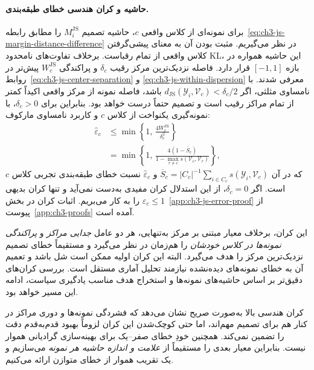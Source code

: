 \paragraph{حاشیه و کران هندسی خطای طبقه‌بندی.}
برای نمونه‌ای از کلاس واقعی $c$، حاشیه تصمیم $M_i^{\mathrm{JS}}$ را مطابق رابطه~\eqref{eq:ch3-js-margin-distance-difference} در نظر می‌گیریم. مثبت بودن آن به معنای پیشی‌گرفتن کلاس واقعی از تمام رقباست. برخلاف تفاوت‌های نامحدود KL، این حاشیه همواره در بازه $[-1,1]$ قرار دارد. فاصله نزدیک‌ترین مرکز رقیب $\delta_c$ و پراکندگی $W_c^{\mathrm{JS}}$ پیش‌تر در روابط~\eqref{eq:ch3-js-center-separation} و \eqref{eq:ch3-js-within-dispersion} معرفی شدند. با نامساوی مثلثی، اگر $d_{\mathrm{JS}}(\mathscr Y_i,\mathcal V_c)<\delta_c/2$ باشد، فاصله نمونه از مرکز واقعی اکیداً کمتر از تمام مراکز رقیب است و تصمیم حتماً درست خواهد بود. بنابراین برای $\delta_c>0$، با نمونه‌گیری یکنواخت از کلاس $c$ و کاربرد نامساوی مارکوف:
\begin{equation}\label{eq:ch3-js-class-error-bound}
\boxed{
\begin{aligned}
\widehat\varepsilon_c
&\le\min\left\{1,\,
\frac{4W_c^{\mathrm{JS}}}{\delta_c^2}\right\}\\
&=\min\left\{1,\,
\frac{4\left(1-\overline S_c\right)}
{1-\max_{r\ne c}s(\mathcal V_c,\mathcal V_r)}\right\},
\end{aligned}}
\end{equation}
که در آن $\overline S_c=|C_c|^{-1}\sum_{i\in C_c}s(\mathscr Y_i,\mathcal V_c)$ و $\widehat\varepsilon_c$ نسبت خطای طبقه‌بندی تجربی کلاس $c$ است. اگر $\delta_c=0$، از این استدلال کران مفیدی به‌دست نمی‌آید و تنها کران بدیهی $\widehat\varepsilon_c\le1$ را به کار می‌بریم. اثبات کران در بخش~\ref{app:ch3-js-error-proof} از پیوست~\ref{app:ch3-proofs} آمده است.

این کران، برخلاف معیار مبتنی بر مرکز به‌تنهایی، هر دو عامل \emph{جدایی مراکز} و \emph{پراکندگی نمونه‌ها در کلاس خودشان} را هم‌زمان در نظر می‌گیرد و مستقیماً خطای تصمیم نزدیک‌ترین مرکز را هدف می‌گیرد. البته این کران اولیه ممکن است شل باشد و تعمیم آن به خطای نمونه‌های دیده‌نشده نیازمند تحلیل آماری مستقل است. بررسی کران‌های دقیق‌تر بر اساس حاشیه‌های نمونه‌ها و استخراج هدف مناسب یادگیری سیاست، ادامه این مسیر خواهد بود.

کران هندسی بالا به‌صورت صریح نشان می‌دهد
که فشردگی نمونه‌ها و دوری مراکز در کنار هم
برای تصمیم مهم‌اند، اما حتی کوچک‌شدن این کران
لزوماً بهبود قدم‌به‌قدم دقت را تضمین نمی‌کند.
همچنین خودِ خطای صفر--یک برای بهینه‌سازی
گرادیانی هموار نیست. بنابراین معیار بعدی را
مستقیماً از \emph{علامت و اندازه حاشیه هر نمونه}
می‌سازیم و یک تقریب هموار از خطای متوازن ارائه می‌کنیم.


